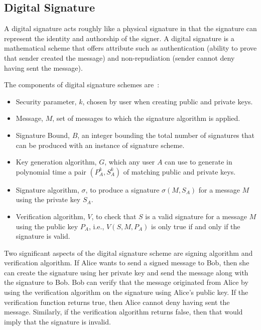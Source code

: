 \subsection{Digital Signature} \label{subsec:digitalsignature}
A digital signature acts roughly like a physical signature in that the
signature can represent the identity and authorship of the signer. A digital
signature is a mathematical scheme that offers attribute such as authentication
(ability to prove that sender created the message) and non-repudiation (sender
cannot deny having sent the message). \par
The components of digital signature schemes are~\cite{rivest1978method}: 
\begin{itemize}
	\item Security parameter, $k$, chosen by user when creating public and
		private keys.
	\item Message, $M$, set of messages to which the signature algorithm is
		applied.
	\item Signature Bound, $B$, an integer bounding the total number of
		signatures that can be produced with an instance of signature scheme.
	\item Key generation algorithm, $G$, which any user $A$ can use to generate
		in polynomial time a pair $(P^{k}_A, S^{k}_A)$ of matching public and
		private keys. 
	\item Signature algorithm, $\sigma$, to produce a signature $\sigma(M,
		S_{A})$ for a message $M$ using the private key $S_{A}$. 
	\item Verification algorithm, $V$, to check that $S$ is a valid signature
		for a message $M$ using the public key $P_{A}$, i.e., $V(S,M,P_A)$ is only
		true if and only if the signature is valid. 
\end{itemize}
Two significant aspects of the digital signature scheme are signing algorithm
and verification algorithm. If Alice wants to send a signed message to Bob,
then she can create the signature using her private key and send the message
along with the signature to Bob. Bob can verify that the message originated
from Alice by using the verification algorithm on the signature using Alice's
public key. If the verification function returns true, then Alice cannot deny
having sent the message. Similarly, if the verification algorithm returns
false, then that would imply that the signature is invalid. \par   

